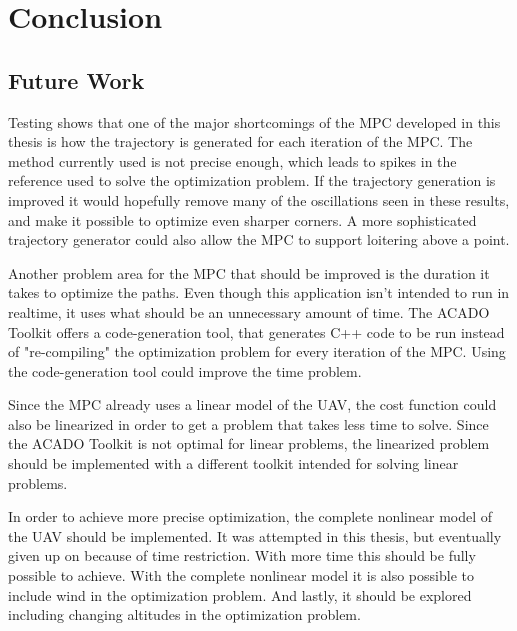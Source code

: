 \chapter{Conclusion}


\section{Future Work}

Testing shows that one of the major shortcomings of the MPC developed in this thesis is how the trajectory is generated for each iteration of the MPC. The method currently used is not precise enough, which leads to spikes in the reference used to solve the optimization problem. If the trajectory generation is improved it would hopefully remove many of the oscillations seen in these results, and make it possible to optimize even sharper corners. A more sophisticated trajectory generator could also allow the MPC to support loitering above a point.

Another problem area for the MPC that should be improved is the duration it takes to optimize the paths. Even though this application isn't intended to run in realtime, it uses what should be an unnecessary amount of time. The ACADO Toolkit offers a code-generation tool, that generates C++ code to be run instead of "re-compiling" the optimization problem for every iteration of the MPC. Using the code-generation tool could improve the time problem.

Since the MPC already uses a linear model of the UAV, the cost function could also be linearized in order to get a problem that takes less time to solve. Since the ACADO Toolkit is not optimal for linear problems, the linearized problem should be implemented with a different toolkit intended for solving linear problems.

In order to achieve more precise optimization, the complete nonlinear model of the UAV should be implemented. It was attempted in this thesis, but eventually given up on because of time restriction. With more time this should be fully possible to achieve. With the complete nonlinear model it is also possible to include wind in the optimization problem. And lastly, it should be explored including changing altitudes in the optimization problem.